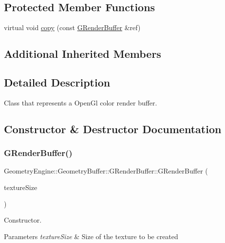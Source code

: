 \subsection*{Protected Member Functions}
\begin{DoxyCompactItemize}
\item 
virtual void \mbox{\hyperlink{class_geometry_engine_1_1_geometry_buffer_1_1_g_render_buffer_ad747a5783a7c5cbae9f4ad9aea753896}{copy}} (const \mbox{\hyperlink{class_geometry_engine_1_1_geometry_buffer_1_1_g_render_buffer}{G\+Render\+Buffer}} \&ref)
\end{DoxyCompactItemize}
\subsection*{Additional Inherited Members}


\subsection{Detailed Description}
Class that represents a Open\+Gl color render buffer. 

\subsection{Constructor \& Destructor Documentation}
\mbox{\label{class_geometry_engine_1_1_geometry_buffer_1_1_g_render_buffer_a2773a6ecf7fa8ee49b45b3f0a99b5b4b}} 
\subsubsection{\texorpdfstring{GRenderBuffer()}{GRenderBuffer()}\hspace{0.1cm}{\footnotesize\ttfamily [1/3]}}
{\footnotesize\ttfamily Geometry\+Engine\+::\+Geometry\+Buffer\+::\+G\+Render\+Buffer\+::\+G\+Render\+Buffer (\begin{DoxyParamCaption}\item[{const Q\+Vector2D \&}]{texture\+Size }\end{DoxyParamCaption})}

Constructor. 
\begin{DoxyParams}{Parameters}
{\em texture\+Size} & Size of the texture to be created \\
\hline
\end{DoxyParams}
\mbox{\label{class_geometry_engine_1_1_geometry_buffer_1_1_g_render_buffer_a9e59998fe3f0dadc0458c1c9755b635a}} 
